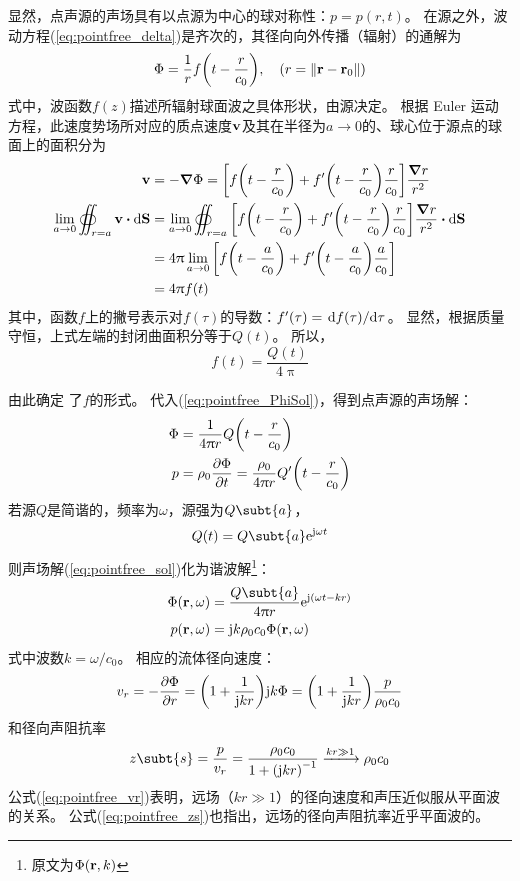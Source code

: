 \documentclass[UTF8]{ctexbook}
\begin{document}
 显然，点声源的声场具有以点源为中心的球对称性：$p=p(r,t)$。
 在源之外，波动方程(\ref{eq:pointfree_delta})是齐次的，其径向向外传播（辐射）的通解为
 \begin{equation}
	 \Phi=\frac1r f\qty(t-\frac{r}{c_0})\qc \qty(r = \norm{\vb{r}-\vb{r}_0})
	 \label{eq:pointfree_PhiSol}
 \end{equation}
 式中，波函数$f(z)$描述所辐射球面波之具体形状，由源决定。
 根据 Euler 运动方程，此速度势场所对应的质点速度$\vb{v}$及其在半径为$a\to0$的、球心位于源点的球面上的面积分为
\begin{align*}
	\vb{v} & = -\grad \Phi = \qty[f\qty(t-\frac{r}{c_0}) +f'\qty(t-\frac{r}{c_0}) \frac{r}{c_0}]\frac{\grad r}{r^2}\\
	\lim_{a\to 0}\oiint_{r=a}\vb{v}\vdot \dd \vb{S} &=
	\lim_{a\to 0} \oiint_{r=a}\qty [f\qty(t-\frac{r}{c_0}) + f'\qty(t-\frac{r}{c_0})\frac{r}{c_0}]\frac{\grad r}{r^2}
	\vdot \dd \vb{S} \\
	&= 4\uppi \lim_{a\to 0} \qty[f\qty(t-\frac{a}{c_0}) +f'\qty(t-\frac{a}{c_0})\frac{a}{c_0}]\\
	& = 4 \uppi f(t)
\end{align*}
其中，函数$f$上的撇号表示对$f(\tau)$的导数：$f'(\tau) = \dv*{f(\tau)}{\tau}$。
显然，根据质量守恒，上式左端的封闭曲面积分等于$Q(t)$。
所以，
\[
f(t)=\frac{Q(t)}{4\uppi}
\]

 由此确定 了$f$的形式。
 代入(\ref{eq:pointfree_PhiSol})，得到点声源的声场解：
 \begin{subequations}
 \begin{align}
	 \Phi & = \frac{1}{4\uppi r}Q\qty(t-\frac{r}{c_0})\\
	 p&= \rho_0 \pdv{\Phi}{t} = \frac{\rho_0}{4\uppi r}Q'\qty(t-\frac{r}{c_0})
 \end{align}
 \label{eq:pointfree_sol}
 \end{subequations}
  若源$Q$是简谐的，频率为$\omega$，源强为$Q\subt{a}$，
  \[Q(t) = Q\subt{a} \me^{\mj \omega t}\]
  则声场解(\ref{eq:pointfree_sol})化为谐波解\footnote{原文为$\Phi(\vb{r},k)$}：
  \begin{subequations}
	  \begin{align}
		  \Phi(\vb{r},\omega) &= \frac{Q\subt{a}}{4\uppi r}\me^{\mj(\omega t -kr)}\\
		  p(\vb{r},\omega) &=\mj k \rho_0 c_0\Phi(\vb{r},\omega)
	  \end{align}
	  \label{}
  \end{subequations}
式中波数$k=\omega/c_0$。
相应的流体径向速度：
\begin{equation}
	v_r=-\pdv{\Phi}{r} = \qty(1+\frac{1}{\mathrm{j} kr})\mathrm{j} k \Phi=\qty(1+\frac{1}{\mathrm{j} kr})\frac{p}{\rho_0c_0}
	\label{eq:pointfree_vr}
\end{equation}
和径向声阻抗率
\begin{align}
	z\subt{s} = \frac{p}{v_r} = \frac{\rho_0c_0}{1+\qty(\mj kr)^{-1}} 
	\xlongrightarrow{kr \gg 1} \rho_0c_0
	\label{eq:pointfree_zs}
\end{align}
 公式(\ref{eq:pointfree_vr})表明，远场（$kr\gg 1$）的径向速度和声压近似服从平面波的关系。
 公式(\ref{eq:pointfree_zs})也指出，远场的径向声阻抗率近乎平面波的。
\end{document}
